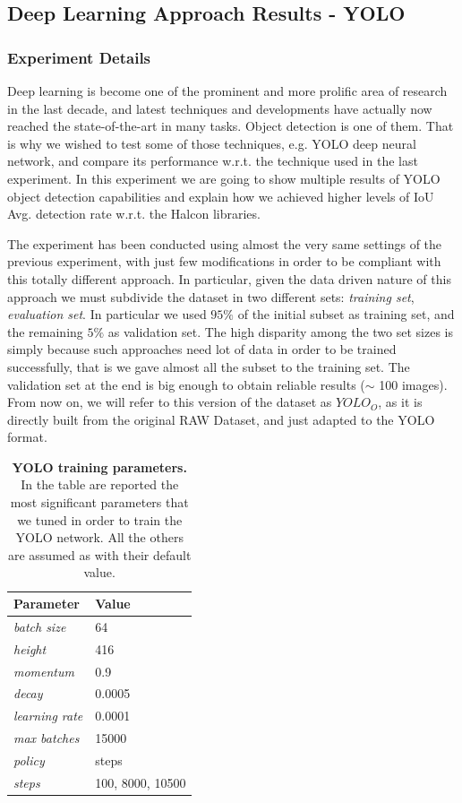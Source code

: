 \subsection{Deep Learning Approach Results - YOLO}\label{subsec:yolo_obj_det_results}
\subsubsection{Experiment Details}
Deep learning is become one of the prominent and more prolific area of research in the last decade, and latest techniques and developments have actually now reached the state-of-the-art in many tasks. Object detection is one of them. That is why we wished to test some of those techniques, e.g. YOLO deep neural network, and compare its performance w.r.t. the technique used in the last experiment. In this experiment we are going to show multiple results of YOLO object detection capabilities and explain how we achieved higher levels of IoU Avg. detection rate w.r.t. the Halcon libraries.

The experiment has been conducted using almost the very same settings of the previous experiment, with just few modifications in order to be compliant with this totally different approach. In particular, given the data driven nature of this approach we must subdivide the dataset in two different sets: \emph{training set}, \emph{evaluation set}. In particular we used $95\%$ of the initial subset as training set, and the remaining $5\%$ as validation set. The high disparity among the two set sizes is simply because such approaches need lot of data in order to be trained successfully, that is we gave almost all the subset to the training set. The validation set at the end is big enough to obtain reliable results ($\sim$ 100 images). From now on, we will refer to this version of the dataset as \emph{$YOLO_O$}, as it is directly built from the original RAW Dataset, and just adapted to the YOLO format.

\begin{table}
	\centering
    \begin{tabular}{| l | l |}
    \hline
    \textbf{Parameter} & \textbf{Value} \\ \hline
    \emph{batch size} & 64 \\
	\emph{height} & 416 \\
	\emph{momentum} & 0.9 \\
	\emph{decay} & 0.0005 \\
	\emph{learning rate} & 0.0001 \\
	\emph{max batches} & 15000 \\
	\emph{policy} & steps \\
	\emph{steps} & 100, 8000, 10500 \\
    \hline
    \end{tabular}
    \caption{\textbf{YOLO training parameters.} In the table are reported the most significant parameters that we tuned in order to train the YOLO network. All the others are assumed as with their default value.}
    \label{tab:YOLO_standard_training_params}
\end{table}

